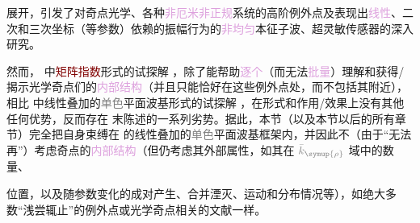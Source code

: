 展开\cite{xieAnalytic3DVector}，引发了对\textcolor{NavyBlue}{奇点光学}\cite{berryOpticalSingularitiesBirefringent2003,berryOpticalSingularitiesBianisotropic2005,kirillovUnfoldingEigenvalueSurfaces2005}、各种\textcolor{Plum}{非厄米}\cite{yangNonabelianPhysicsLight2024}\textcolor{Plum}{非正规}\cite{wiersigDistanceExceptionalPoints2022}系统的高阶\textcolor{PineGreen}{例外点}\cite{mackayExceptionalGuidedWaves2021,wiersigMovingExceptionalSurface2023}及表现出\textcolor{Plum}{线性}、二次和三次坐标（等参数）依赖的\textcolor{PineGreen}{振幅}行为的\textcolor{Plum}{非均匀}\textcolor{PineGreen}{本征子波}\cite{lakhtakiaElectromagneticSurfaceWaves2020,gerardinConditionsVoigtWave2001,borzdovWavesLinearQuadratic1996,sturmElectromagneticWavesCrystals2024,sturmPropagationElectromagneticWaves}、超灵敏传感器\cite{wiersigReviewExceptionalPointbased2020,wiersigMovingExceptionalSurface2023}的深入研究。

然而， 中\textcolor{Maroon}{矩阵指数}形式的试探解 ，除了能帮助\textcolor{Plum}{逐个}（而无法\textcolor{Plum}{批量}）理解和获得/揭示\textcolor{PineGreen}{光学奇点}们的\textcolor{Plum}{内部结构}（并且只能恰好在这些\textcolor{PineGreen}{例外点}处，而不包括其附近），相比  中\textcolor{PineGreen}{线性叠加的\textcolor{gray}{单色}平面波基}形式的试探解 ，在形式和作用/效果上没有其他任何优势，反而存在  末陈述的一系列劣势。据此，本节（以及本节以后的所有章节）完全把自身束缚在  的\textcolor{PineGreen}{线性叠加的\textcolor{gray}{单色}平面波基}框架内，并因此不（由于“无法再”）考虑奇点的\textcolor{Plum}{内部结构}（但仍考虑其外部属性，如其在 $\mathcolor{gray}{\bar{k}_{\symup{\rho}}}$ 域中的数量、

\clearpage

\noindent 位置，以及随参数变化的成对产生、合并湮灭、运动和分布情况等），如绝大多数“浅尝辄止”的\textcolor{PineGreen}{例外点}\cite{hernandezExceptionalPointsNonHermitian2011,hanExceptionalEntanglementPhenomena2023,baiObservationNonlinearExceptional2024,baiNonlinearExceptionalPoints2023}或\textcolor{PineGreen}{光学奇点}\cite{richterExceptionalPointsAnisotropic2017,grundmannSingularOpticalAxes2016,berryOpticalSingularitiesBirefringent2003,berryOpticalSingularitiesBianisotropic2005,grundmannOpticallyAnisotropicMedia2017}相关的文献一样。

